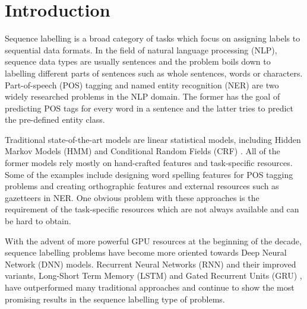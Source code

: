 \section{Introduction}
Sequence labelling is a broad category of tasks which focus on assigning labels
to sequential data formats. In the field of natural language processing (NLP),
sequence data types are usually sentences and the problem boils down to
labelling different parts of sentences such as whole sentences, words or
characters. Part-of-speech (POS) tagging and named entity recognition (NER)
are two widely researched problems in the NLP domain. The former has the goal
of predicting POS tags for every word in a sentence and the latter tries to
predict the pre-defined entity class.

Traditional state-of-the-art models are linear statistical models, including
Hidden Markov Models (HMM) \cite{baum1966statistical} and Conditional Random Fields
(CRF) \cite{lafferty2001conditional}. All of the former models rely mostly on hand-crafted features
and task-specific resources. Some of the examples include designing word
spelling features for POS tagging problems and creating orthographic features
and external resources such as gazetteers in NER. One obvious problem with
these approaches is the requirement of the task-specific resources which are not
always available and can be hard to obtain.

With the advent of more powerful GPU resources at the beginning of the decade,
sequence labelling problems have become more oriented towards Deep Neural
Network (DNN) models. Recurrent Neural Networks (RNN) \cite{goller1996learning} and their
improved variants, Long-Short Term Memory (LSTM) \cite{hochreiter1997long} and Gated Recurrent
Units (GRU) \cite{cho2014properties}, have outperformed many traditional approaches and
continue to show the most promising results in the sequence labelling type of
problems.

